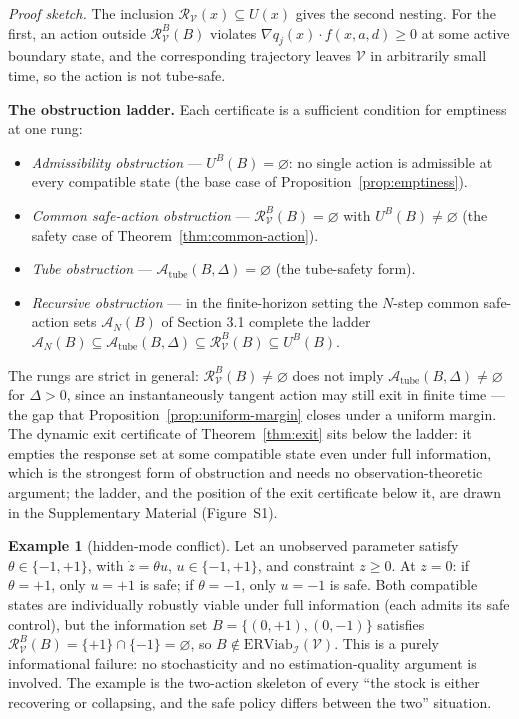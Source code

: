 \documentclass[10pt,twocolumn]{article}
\theoremstyle{definition}
\newtheorem{example}{Example}
\begin{document}
\emph{Proof sketch.} The inclusion \(\mathcal{R}_{\mathcal{V}}(x) \subseteq U(x)\) gives the second nesting. For the first, an action outside \(\mathcal{R}_{\mathcal{V}}^B(B)\) violates \(\nabla q_j(x) \cdot f(x, a, d) \ge 0\) at some active boundary state, and the corresponding trajectory leaves \(\mathcal{V}\) in arbitrarily small time, so the action is not tube-safe.

\textbf{The obstruction ladder.} Each certificate is a sufficient
condition for emptiness at one rung:
\begin{itemize}
\item \emph{Admissibility obstruction} --- \(U^B(B)=\varnothing\): no
single action is admissible at every compatible state (the base case of
Proposition~\ref{prop:emptiness}).
\item \emph{Common safe-action obstruction} ---
\(\mathcal{R}_{\mathcal{V}}^B(B)=\varnothing\) with
\(U^B(B)\neq\varnothing\) (the safety case of
Theorem~\ref{thm:common-action}).
\item \emph{Tube obstruction} ---
\(\mathcal{A}_{\mathrm{tube}}(B,\Delta)=\varnothing\) (the tube-safety
form).
\item \emph{Recursive obstruction} --- in the finite-horizon setting the
\(N\)-step common safe-action sets \(\mathcal{A}_N(B)\) of Section 3.1 complete the ladder
\(\mathcal{A}_N(B)\subseteq\mathcal{A}_{\mathrm{tube}}(B,\Delta)\subseteq\mathcal{R}_{\mathcal{V}}^B(B)\subseteq U^B(B)\).
\end{itemize}
The rungs are strict in general: \(\mathcal{R}_{\mathcal{V}}^B(B)\neq\varnothing\)
does not imply \(\mathcal{A}_{\mathrm{tube}}(B,\Delta)\neq\varnothing\)
for \(\Delta>0\), since an instantaneously tangent action may still exit
in finite time --- the gap that Proposition~\ref{prop:uniform-margin}
closes under a uniform margin. The dynamic exit certificate of
Theorem~\ref{thm:exit} sits below the ladder: it empties the response
set at some compatible state even under full information, which is the
strongest form of obstruction and needs no observation-theoretic
argument; the ladder, and the position of the exit certificate below it, are drawn in the Supplementary Material (Figure~S1).



\begin{example}[hidden-mode conflict]\label{ex:hidden-mode} Let an unobserved parameter satisfy
\(\theta \in \{-1, +1\}\), with \(\dot z = \theta u\),
\(u \in \{-1, +1\}\), and constraint \(z \ge 0\). At \(z = 0\): if
\(\theta = +1\), only \(u = +1\) is safe; if \(\theta = -1\), only
\(u = -1\) is safe. Both compatible states are individually robustly
viable under full information (each admits its safe control), but the
information set \(B = \{(0, +1), (0, -1)\}\) satisfies
\(\mathcal{R}_{\mathcal{V}}^B(B) = \{+1\} \cap \{-1\} = \varnothing\),
so \(B \notin \mathrm{ERViab}_{\mathcal{I}}(\mathcal{V})\). This is a
purely informational failure: no stochasticity and no estimation-quality
argument is involved. The example is the two-action skeleton of every
``the stock is either recovering or collapsing, and the safe policy
differs between the two'' situation.

\end{example}
\end{document}
